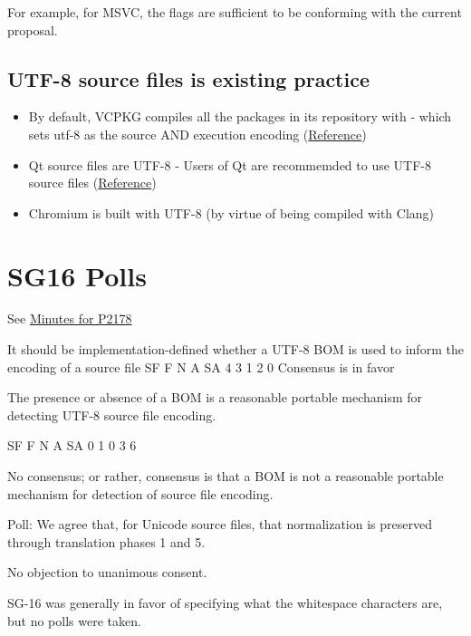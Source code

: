 \documentclass{wg21}
\begin{document}
For example, for MSVC, the flags  are sufficient to be conforming with the current proposal.


\subsection{UTF-8 source files is existing practice}

\begin{itemize}
    \item By default, VCPKG compiles all the packages in its repository with  - which sets utf-8 as the source AND execution encoding (\href{https://github.com/vicroms/vcpkg/blob/master/scripts/toolchains/windows.cmake#L16}{Reference})
    \item Qt source files are UTF-8 - Users of Qt are recommemded to use UTF-8 source files (\href{https://wiki.qt.io/Strings_and_encodings_in_Qt}{Reference})
    \item Chromium is built with UTF-8 (by virtue of being compiled with Clang)
\end{itemize}

\section{SG16 Polls}

See \href{https://github.com/sg16-unicode/sg16-meetings/blob/master/README-2020.md}{Minutes for P2178}

\begin{codeblock}


It should be implementation-defined whether a UTF-8 BOM is used to inform the encoding of a source file
SF	F	N	A	SA
4	3	1	2	0
Consensus is in favor

The presence or absence of a BOM is a reasonable portable mechanism
for detecting UTF-8 source file encoding.

SF	F	N	A	SA
0	1	0	3	6

No consensus;  or rather,
consensus is that a BOM is not a reasonable portable mechanism for detection of source file encoding.


Poll: We agree that, for Unicode source files, that normalization is preserved
through translation phases 1 and 5.

No objection to unanimous consent.

\end{codeblock}

SG-16 was generally in favor of specifying what the whitespace characters are, but no polls were taken.
\end{document}
